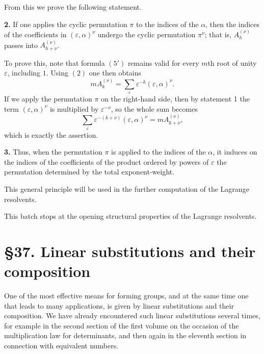 \documentclass[11pt,a4paper]{book}
\begin{document}
From this we prove the following statement.

\medskip
\noindent\textbf{2.}
If one applies the cyclic permutation $\pi$ to the indices of the $\alpha$, then the indices of the coefficients in $(\varepsilon,\alpha)^\nu$ undergo the cyclic permutation $\pi^\nu$; that is, $A^{(\nu)}_h$ passes into $A^{(\nu)}_{h+\nu}$.

\medskip
To prove this, note that formula \((5')\) remains valid for every $m$th root of unity $\varepsilon$, including $1$. Using \((2)\) one then obtains
\[
mA^{(\nu)}_k=\sum_{\varepsilon}\varepsilon^{-k}(\varepsilon,\alpha)^\nu.
\tag{6}
\]
If we apply the permutation $\pi$ on the right-hand side, then by statement 1 the term $(\varepsilon,\alpha)^\nu$ is multiplied by $\varepsilon^{-\nu}$, so the whole sum becomes
\[
\sum_{\varepsilon}\varepsilon^{-(k+\nu)}(\varepsilon,\alpha)^\nu
=
mA^{(\nu)}_{k+\nu},
\]
which is exactly the assertion.

\medskip
\noindent\textbf{3.}
Thus, when the permutation $\pi$ is applied to the indices of the $\alpha$, it induces on the indices of the coefficients of the product ordered by powers of $\varepsilon$ the permutation determined by the total exponent-weight.

\medskip
This general principle will be used in the further computation of the Lagrange resolvents.

\medskip
\noindent This batch stops at the opening structural properties of the Lagrange resolvents.

\section*{\S 37. Linear substitutions and their composition}

One of the most effective means for forming groups, and at the same time one that leads to many applications, is given by linear substitutions and their composition. We have already encountered such linear substitutions several times, for example in the second section of the first volume on the occasion of the multiplication law for determinants, and then again in the eleventh section in connection with equivalent numbers.
\end{document}
